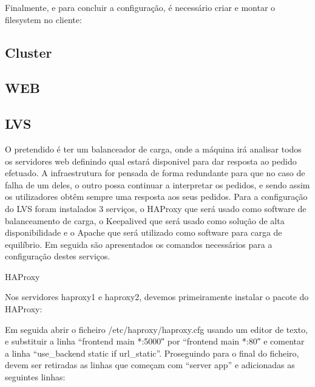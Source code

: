 Finalmente, e para concluir a configuração, é necessário criar e montar o filesystem no cliente:
 \par
{} \par
{} \par


\subsection{Cluster}

\subsection{WEB}

\subsection{LVS}
O pretendido é ter um balanceador de carga, onde a máquina irá analisar todos os servidores web definindo qual estará disponivel para dar resposta ao pedido efetuado.
A infraestrutura for pensada de forma redundante para que no caso de falha de um deles, o outro possa continuar a interpretar os pedidos, e sendo assim os utilizadores obtêm sempre uma resposta aos seus pedidos.
Para a configuração do LVS foram instalados 3 serviços, o HAProxy que será usado como software de balanceamento de carga, o Keepalived que será usado como solução de alta disponibilidade e o Apache que será utilizado como software para carga de equilíbrio. Em seguida são apresentados os comandos necessários para a configuração destes serviços.


HAProxy

Nos servidores haproxy1 e haproxy2, devemos primeiramente instalar o pacote do HAProxy:
 \par

Em seguida abrir o ficheiro /etc/haproxy/haproxy.cfg usando um editor de texto, e substituir a linha “frontend  main *:5000″ por “frontend  main *:80″ e comentar a linha “use_backend static if url_static”.
Proseguindo para o final do ficheiro, devem ser retiradas as linhas que começam com “server app” e adicionadas as seguintes linhas:
 \par
{} \par

